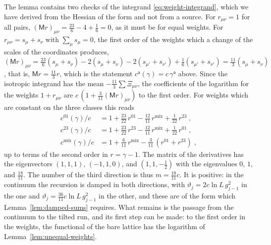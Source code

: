 \documentclass[11pt]{preprint}
\numberwithin{equation}{section}
\theoremstyle{definition}
\theoremstyle{remark}
\theoremstyle{plain}
\begin{document}
The lemma contains two checks of the integrand \eqref{eq:weight-integrand}, which we have derived from the Hessian of the form and not from a source. For $r_{\mu\nu} = 1$ for all pairs, $(\mathsf Mr)_{\mu\nu} = \frac{23}{6} - 4 + \frac16 = 0$, as it must be for equal weights. For $r_{\mu\nu} = s_\mu + s_\nu$ with $\sum_\mu s_\mu = 0$, the first order of the weights which a change of the scales of the coordinates produces, $(\mathsf Mr)_{\mu\nu} = \frac{23}{6}(s_\mu + s_\nu) - 2(s_\mu + s_\nu) - 2(s_{\mu'} + s_{\nu'}) + \frac16(s_{\mu'} + s_{\nu'}) = \frac{11}{3}(s_\mu + s_\nu)$, that is, $\mathsf Mr = \frac{11}{3}r$, which is the statement $c^{\mathsf a}(\gamma) = c\,\gamma^{\mathsf a}$ above. Since the isotropic integrand has the mean $-\frac{11}{3}\sum\Xi_{\mu\nu}$, the coefficients of the logarithm for the weights $1 + r_{\mu\nu}$ are $c\,(1 + \frac{3}{11}(\mathsf Mr)_{\mu\nu})$ to the first order. For weights which are constant on the three classes this reads
\begin{equation}\label{eq:weight-derivative}
\begin{aligned}
    c^{01}(\gamma)/c &= 1 + \tfrac{23}{22}\,r^{01} - \tfrac{12}{11}\,r^{\mathrm{mix}} + \tfrac{1}{22}\,r^{23}\;,\\
    c^{23}(\gamma)/c &= 1 + \tfrac{23}{22}\,r^{23} - \tfrac{12}{11}\,r^{\mathrm{mix}} + \tfrac{1}{22}\,r^{01}\;,\\
    c^{\mathrm{mix}}(\gamma)/c &= 1 + \tfrac{6}{11}\,r^{\mathrm{mix}} - \tfrac{3}{11}\,(r^{01} + r^{23})\;,
\end{aligned}
\end{equation}
up to terms of the second order in $r = \gamma - 1$. The matrix of the derivatives has the eigenvectors $(1, 1, 1)$, $(-1, 1, 0)$, and $(1, 1, -\frac12)$ with the eigenvalues $0$, $1$, and $\frac{18}{11}$. The number of the third direction is thus $m = \frac{18}{11}c$. It is positive: in the continuum the recursion is damped in both directions, with $\vartheta_j = 2c\ln L\,g_{j-1}^2$ in the one and $\vartheta_j = \frac{36}{11}c\ln L\,g_{j-1}^2$ in the other, and these are of the form which Lemma~\ref{lem:damped-sums} requires. What remains is the passage from the continuum to the tilted run, and its first step can be made: to the first order in the weights, the functional of the bare lattice has the logarithm of Lemma~\ref{lem:unequal-weights}.
\end{document}
